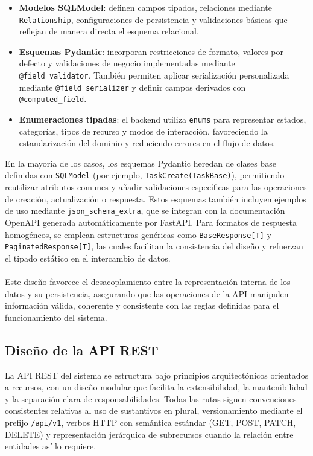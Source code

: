 \begin{itemize}
    \item \textbf{Modelos SQLModel}: definen campos tipados, relaciones mediante 
    \texttt{Relationship}, configuraciones de persistencia y validaciones básicas que 
    reflejan de manera directa el esquema relacional.
    
    \item \textbf{Esquemas Pydantic}: incorporan restricciones de formato, valores por 
    defecto y validaciones de negocio implementadas mediante 
    \texttt{@field\_validator}. También permiten aplicar serialización personalizada 
    mediante \texttt{@field\_serializer} y definir campos derivados con 
    \texttt{@computed\_field}.
    
    \item \textbf{Enumeraciones tipadas}: el backend utiliza \texttt{enums} para 
    representar estados, categorías, tipos de recurso y modos de interacción, 
    favoreciendo la estandarización del dominio y reduciendo errores en el flujo de 
    datos.
\end{itemize}

En la mayoría de los casos, los esquemas Pydantic heredan de clases base definidas con
\texttt{SQLModel} (por ejemplo, \texttt{TaskCreate(TaskBase)}), permitiendo reutilizar
atributos comunes y añadir validaciones específicas para las operaciones de creación,
actualización o respuesta. Estos esquemas también incluyen ejemplos de uso mediante
\texttt{json\_schema\_extra}, que se integran con la documentación OpenAPI generada
automáticamente por FastAPI. Para formatos de respuesta homogéneos, se emplean
estructuras genéricas como \texttt{BaseResponse[T]} y \texttt{PaginatedResponse[T]},
las cuales facilitan la consistencia del diseño y refuerzan el tipado estático en el
intercambio de datos.
\\
\\
Este diseño favorece el desacoplamiento entre la representación interna de los datos y su persistencia, asegurando que las operaciones de la API manipulen información válida, coherente y consistente con las reglas definidas para el funcionamiento del sistema.

\subsection{Diseño de la API REST}

La API REST del sistema se estructura bajo principios arquitectónicos orientados a recursos, con un diseño modular que facilita la extensibilidad, la mantenibilidad y la separación clara de responsabilidades. Todas las rutas siguen convenciones consistentes relativas al uso de sustantivos en plural, versionamiento mediante el prefijo \texttt{/api/v1}, verbos HTTP con semántica estándar (GET, POST, PATCH, DELETE) y representación jerárquica de subrecursos cuando la relación entre entidades así lo requiere.

